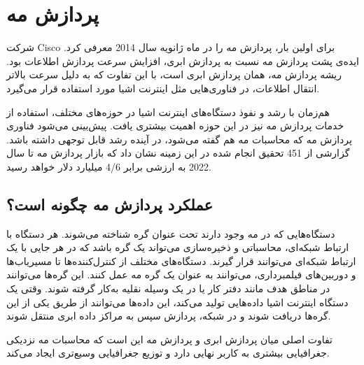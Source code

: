   \section{پردازش مه}
  شرکت Cisco برای اولین بار، پردازش مه را در ماه ژانویه سال 2014 معرفی کرد. ایده‌ی پشت پردازش مه نسبت به پردازش ابری، افزایش سرعت پردازش اطلاعات بود. ریشه پردازش مه، همان پردازش ابری است، با این تفاوت که به دلیل سرعت بالاتر انتقال اطلاعات، در فناوری‌هایی مثل اینترنت اشیا مورد استفاده قرار می‌گیرد.
  
  هم‌زمان با رشد و نفوذ دستگاه‌های اینترنت اشیا در حوزه‌های مختلف، استفاده از خدمات پردازش مه نیز در این حوزه اهمیت بیشتری یافت. پیش‌بینی می‌شود فناوری پردازش مه که محاسبات مه هم گفته می‌شود، در آینده رشد قابل توجهی داشته باشد. گزارشی از 451 تحقیق انجام شده در این زمینه نشان داد که بازار پردازش مه تا سال 2022 به ارزشی برابر 4/6 میلیارد دلار خواهد رسید.
  
  \subsection{عملکرد پردازش مه چگونه است؟}
  دستگاه‌هایی که در مه وجود دارند تحت عنوان گره شناخته می‌شوند. هر دستگاه با ارتباط شبکه‌ای، محاسباتی و ذخیره‌سازی می‌تواند یک گره باشد که در هر جایی با یک ارتباط شبکه‌ای می‌توانند قرار گیرند. دستگاه‌های مختلف از کنترل‌کننده‌ها تا مسیریاب‌ها و دوربین‌های فیلمبرداری، می‌توانند به عنوان یک گره مه عمل کنند. این گره‌ها می‌توانند در مناطق هدف مانند دفتر کار یا در یک وسیله نقلیه به‌کار گرفته شوند. وقتی یک دستگاه اینترنت اشیا داده‌هایی تولید می‌کند، این داده‌ها می‌توانند از طریق یکی از این گره‌ها دریافت شوند و در شبکه، پردازش سپس به مراکز داده ابری منتقل ‌شوند.
  
  تفاوت اصلی میان پردازش ابری و پردازش مه این است که محاسبات مه نزدیکی جغرافیایی بیشتری به کاربر نهایی دارد و توزیع جغرافیایی وسیع‌تری ایجاد می‌کند.
  
